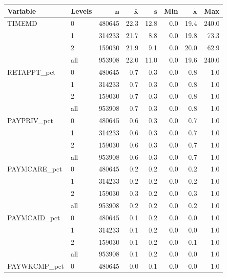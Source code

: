 \begin{table}[ht]
\centering
{\footnotesize
\begin{tabular}{llrrrrrr}
 \textbf{Variable} & \textbf{Levels} & $\mathbf{n}$ & $\mathbf{\bar{x}}$ & $\mathbf{s}$ & \textbf{Min} & $\mathbf{\widetilde{x}}$ & \textbf{Max} \\ 
  \hline
TIMEMD & 0 & 480645 &   22.3 &   12.8 & 0.0 &   19.4 &  240.0 \\ 
   & 1 & 314233 &   21.7 &    8.8 & 0.0 &   19.8 &   73.3 \\ 
   & 2 & 159030 &   21.9 &    9.1 & 0.0 &   20.0 &   62.9 \\ 
   \hline
 & all & 953908 &   22.0 &   11.0 & 0.0 &   19.6 &  240.0 \\ 
   \hline
RETAPPT\_pct & 0 & 480645 &    0.7 &    0.3 & 0.0 &    0.8 &    1.0 \\ 
   & 1 & 314233 &    0.7 &    0.3 & 0.0 &    0.8 &    1.0 \\ 
   & 2 & 159030 &    0.7 &    0.3 & 0.0 &    0.8 &    1.0 \\ 
   \hline
 & all & 953908 &    0.7 &    0.3 & 0.0 &    0.8 &    1.0 \\ 
   \hline
PAYPRIV\_pct & 0 & 480645 &    0.6 &    0.3 & 0.0 &    0.7 &    1.0 \\ 
   & 1 & 314233 &    0.6 &    0.3 & 0.0 &    0.7 &    1.0 \\ 
   & 2 & 159030 &    0.6 &    0.3 & 0.0 &    0.7 &    1.0 \\ 
   \hline
 & all & 953908 &    0.6 &    0.3 & 0.0 &    0.7 &    1.0 \\ 
   \hline
PAYMCARE\_pct & 0 & 480645 &    0.2 &    0.2 & 0.0 &    0.2 &    1.0 \\ 
   & 1 & 314233 &    0.2 &    0.2 & 0.0 &    0.2 &    1.0 \\ 
   & 2 & 159030 &    0.3 &    0.2 & 0.0 &    0.3 &    1.0 \\ 
   \hline
 & all & 953908 &    0.2 &    0.2 & 0.0 &    0.2 &    1.0 \\ 
   \hline
PAYMCAID\_pct & 0 & 480645 &    0.1 &    0.2 & 0.0 &    0.0 &    1.0 \\ 
   & 1 & 314233 &    0.1 &    0.2 & 0.0 &    0.0 &    1.0 \\ 
   & 2 & 159030 &    0.1 &    0.2 & 0.0 &    0.1 &    1.0 \\ 
   \hline
 & all & 953908 &    0.1 &    0.2 & 0.0 &    0.0 &    1.0 \\ 
   \hline
PAYWKCMP\_pct & 0 & 480645 &    0.0 &    0.1 & 0.0 &    0.0 &    1.0 \\ 

\end{tabular}}
\end{table}
